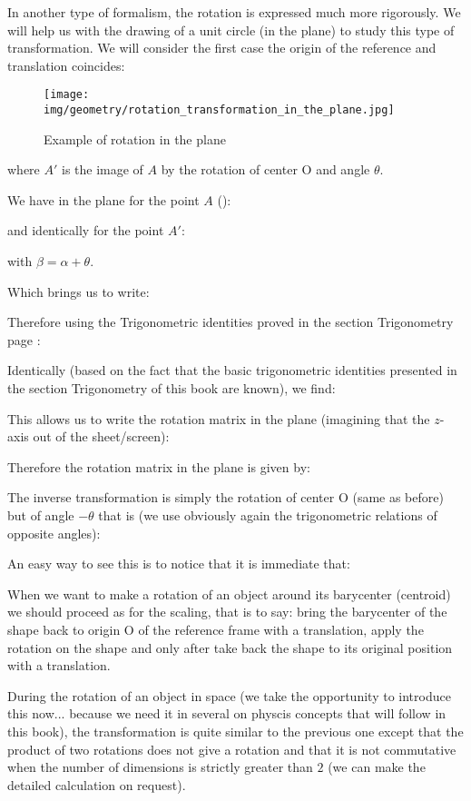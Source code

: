 	In another type of formalism, the rotation is expressed much more rigorously. We will help us with the drawing of a unit circle (in the plane) to study this type of transformation. We will consider the first case the origin of the reference and translation coincides: 
	\begin{figure}[H]
		\centering
		\texttt{[image: img/geometry/rotation\_transformation\_in\_the\_plane.jpg]}
		\caption{Example of rotation in the plane}
	\end{figure}
	where $A'$ is the image of $A$ by the rotation of center O and angle $\theta$.

	We have in the plane for the point $A$ ():
	
	and identically for the point $A'$:
	
	with $\beta=\alpha+\theta$.

	Which brings us to write:
	
	Therefore using the Trigonometric identities proved in the section Trigonometry page \pageref{remarkable trigonometric identities}:
	
	Identically (based on the fact that the basic trigonometric identities presented in the section Trigonometry of this book are known), we find:
	
	This allows us to write the rotation matrix in the plane (imagining that the $z$-axis out of the sheet/screen)\label{rotation matrix in the plane}:
	
	Therefore the rotation matrix in the plane is given by:
	
	The inverse transformation is simply the rotation of center O (same as before) but of angle $-\theta$ that is (we use obviously again the trigonometric relations of opposite angles):
	
	An easy way to see this is to notice that it is immediate that:
	
	When we want to make a rotation of an object around its barycenter (centroid) we should proceed as for the scaling, that is to say: bring the barycenter of the shape back to origin O of the reference frame with a translation, apply the rotation on the shape and only after take back the shape to its original position with a translation.
	
	\label{3d rotation matrix around}During the rotation of an object in space (we take the opportunity to introduce this now... because we need it in several on physcis concepts that will follow in this book), the transformation is quite similar to the previous one except that the product of two rotations does not give a rotation and that it is not commutative when the number of dimensions is strictly greater than $2$ (we can make the detailed calculation on request).
	
